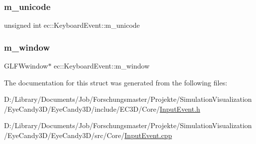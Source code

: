 \subsubsection{\texorpdfstring{m\+\_\+unicode}{m\_unicode}}
{\footnotesize\ttfamily unsigned int ec\+::\+Keyboard\+Event\+::m\+\_\+unicode}

\mbox{\label{structec_1_1_keyboard_event_a6de06c21e83612aeca727beedd93ae82}} 
\subsubsection{\texorpdfstring{m\+\_\+window}{m\_window}}
{\footnotesize\ttfamily G\+L\+F\+Wwindow$\ast$ ec\+::\+Keyboard\+Event\+::m\+\_\+window}



The documentation for this struct was generated from the following files\+:\begin{DoxyCompactItemize}
\item 
D\+:/\+Library/\+Documents/\+Job/\+Forschungsmaster/\+Projekte/\+Simulation\+Visualization/\+Eye\+Candy3\+D/\+Eye\+Candy3\+D/include/\+E\+C3\+D/\+Core/\mbox{\hyperlink{_input_event_8h}{Input\+Event.\+h}}\item 
D\+:/\+Library/\+Documents/\+Job/\+Forschungsmaster/\+Projekte/\+Simulation\+Visualization/\+Eye\+Candy3\+D/\+Eye\+Candy3\+D/src/\+Core/\mbox{\hyperlink{_input_event_8cpp}{Input\+Event.\+cpp}}\end{DoxyCompactItemize}
